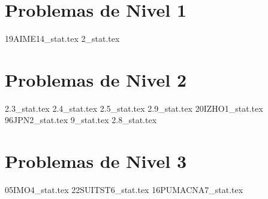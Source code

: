 \section{Problemas de Nivel 1}
{19AIME14_stat.tex} %
{2_stat.tex} %

\section{Problemas de Nivel 2}
{2.3_stat.tex} %
{2.4_stat.tex} %
{2.5_stat.tex} %
{2.9_stat.tex} %
{20IZHO1_stat.tex} %
{96JPN2_stat.tex} %
{9_stat.tex} %
{2.8_stat.tex} %


\section{Problemas de Nivel 3}
{05IMO4_stat.tex} %
{22SUITST6_stat.tex} %
{16PUMACNA7_stat.tex} %